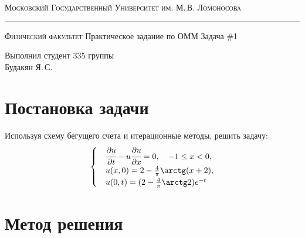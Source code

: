\documentclass[12pt]{article}
\author{Будакян Я. С.}
\def\dd#1#2{\cfrac{\partial#1}{\partial#2}}
\begin{document}
	\begin{titlepage}
	
		\begin{center}
			{\small\textsc{Московский Государственный Университет им. М.\,В. Ломоносова}}
			\vskip 1pt \hrule \vskip 3pt
			{\small\textsc{Физический факультет}}
			\vfill
			{\Large Практическое задание по ОММ}
			\break
			\break
			{\Large Задача \#1}	
		\end{center}
		\vfill
		\begin{flushright}
			{Выполнил студент 335 группы \\Будакян Я.\,С.}
		\end{flushright}
	\end{titlepage}
	
	\section{Постановка задачи}
		\bigskip\par{}
		Используя схему бегущего счета и итерационные методы, решить задачу:
		\begin{equation}\label{eq:problem}
			\begin{cases}
				&\dd{u}t - u\dd{u}x = 0, \quad -1 \le x < 0, \\
				&u(x, 0) = 2 - \frac{4}{\pi}\arctg(x+2), \\
				&u(0, t) = (2 - \frac{4}{\pi}\arctg2)e^{-t}
			\end{cases}
		\end{equation}
	
	\section{Метод решения}
		
	
\end{document}
